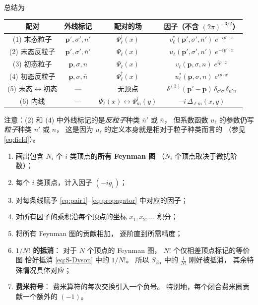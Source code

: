总结为
\begin{center}
\renewcommand{\arraystretch}{1.8}
\begin{tabular}{c|c|c|c}
\hline
配对 & 外线标记 & 配对的场 & 因子（不含 $(2\pi)^{-3/2}$）\\
\hline\hline
(1) 末态粒子 & $\boldsymbol{p}',\sigma',n'$ & $\Psi_\ell^\dagger(x)$
  & $v_\ell^*(\boldsymbol{p}',\sigma',n')\;e^{-ip'\cdot x}$ \\
(2) 末态反粒子 & $\boldsymbol{p}',\sigma',\bar{n}'$ & $\Psi_\ell(x)$
  & $u_\ell(\boldsymbol{p}',\sigma',n')\;e^{-ip'\cdot x}$ \\
(3) 初态粒子 & $\boldsymbol{p},\sigma,n$ & $\Psi_\ell(x)$
  & $v_\ell(\boldsymbol{p},\sigma,n)\;e^{ip\cdot x}$ \\
(4) 初态反粒子 & $\boldsymbol{p},\sigma,\bar{n}$ & $\Psi_\ell^\dagger(x)$
  & $u_\ell^*(\boldsymbol{p},\sigma,n)\;e^{ip\cdot x}$ \\
(5) 末态$\leftrightarrow$初态 & — & 无顶点
  & $\delta^{(3)}(\boldsymbol{p}'-\boldsymbol{p})\,\delta_{\sigma'\sigma}\,\delta_{n'n}$ \\
(6) 内线 & — & $\Psi_\ell(x)\leftrightarrow\Psi_m^\dagger(y)$
  & $-i\,\Delta_{\ell m}(x,y)$ \\
\hline
\end{tabular}
\end{center}

\noindent
注意：(2) 和 (4) 中外线标记的是\emph{反粒子}种类 $\bar{n}'$ 或 $\bar{n}$，
但系数函数 $u_\ell$ 的参数仍写\emph{粒子}种类 $n'$ 或 $n$，
这是因为 $u_\ell$ 的定义本身就是相对于粒子种类而言的
（参见 \eqref{eq:field}）。


\begin{enumerate}
\item 画出包含 $N_i$ 个 $i$ 类顶点的\textbf{所有 Feynman 图}
  （$N_i$ 个顶点取决于微扰阶数）；

\item 每个 $i$ 类顶点，计入因子 $(-ig_i)$；

\item 对每条线赋予 \eqref{eq:pair1}--\eqref{eq:propagator} 中对应的因子；

\item 对所有因子的乘积沿每个顶点的坐标 $x_1,x_2,\ldots$ 积分；

\item 将所有 Feynman 图的贡献相加，
  逐阶直到所需精度；

\item \textbf{$1/N!$ 的抵消}：
  对于 $N$ 个顶点的 Feynman 图，
  $N!$ 个仅相差顶点标记的等价图
  恰好抵消 \eqref{eq:S-Dyson} 中的 $1/N!$。
  所以 $S_{\beta\alpha}$ 中的 $\frac{1}{N!}$ 刚好被抵消，
  其余特殊情况具体对应；

\item \textbf{费米符号}：
  费米算符的每次交换引入一个负号。
  特别地，每个闭合费米圈贡献一个额外的 $(-1)$。
\end{enumerate}


